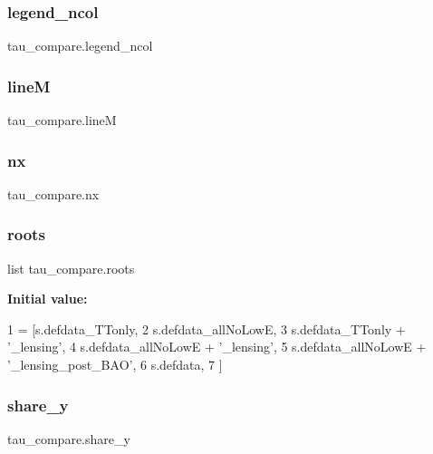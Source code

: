 \subsubsection{\texorpdfstring{legend\+\_\+ncol}{legend\_ncol}}
{\footnotesize\ttfamily tau\+\_\+compare.\+legend\+\_\+ncol}

\mbox{\label{namespacetau__compare_aaf608519a9e74ab10200d907d414605b}} 
\subsubsection{\texorpdfstring{lineM}{lineM}}
{\footnotesize\ttfamily tau\+\_\+compare.\+lineM}

\mbox{\label{namespacetau__compare_abd426ddf2ad52463f838a1bde10d9bf4}} 
\subsubsection{\texorpdfstring{nx}{nx}}
{\footnotesize\ttfamily tau\+\_\+compare.\+nx}

\mbox{\label{namespacetau__compare_a69326ca7ec30f0fa8c8fab5ad340fd72}} 
\subsubsection{\texorpdfstring{roots}{roots}}
{\footnotesize\ttfamily list tau\+\_\+compare.\+roots}

{\bfseries Initial value\+:}
\begin{DoxyCode}
1 =  [s.defdata\_TTonly,
2          s.defdata\_allNoLowE,
3          s.defdata\_TTonly + \textcolor{stringliteral}{'\_lensing'},
4          s.defdata\_allNoLowE + \textcolor{stringliteral}{'\_lensing'},
5          s.defdata\_allNoLowE + \textcolor{stringliteral}{'\_lensing\_post\_BAO'},
6          s.defdata,
7          ]
\end{DoxyCode}
\mbox{\label{namespacetau__compare_a91a72df96d0ee7e670847f65c2ba816d}} 
\subsubsection{\texorpdfstring{share\+\_\+y}{share\_y}}
{\footnotesize\ttfamily tau\+\_\+compare.\+share\+\_\+y}

